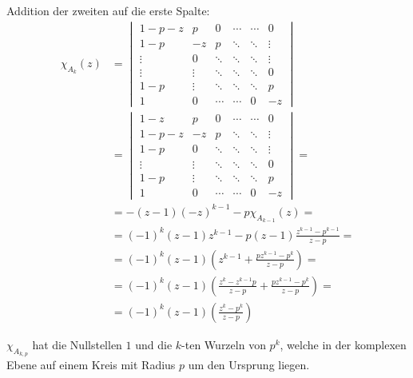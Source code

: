 \begin{flushenum}
\begin{itemize}
      Addition der zweiten auf die erste Spalte:
      \begin{equation*}
      \begin{split} \chi_{A_{k}}(z) & = \begin{vmatrix}
                            1-p-z & p  & 0  & \cdots & \cdots & 0 \\
                            1-p & -z & p  & \ddots & \ddots & \vdots \\
                            \vdots & 0  & \ddots & \ddots & \ddots & \vdots \\
                            \vdots & \vdots  & \ddots & \ddots & \ddots & 0 \\
                            1-p & \vdots  & \ddots & \ddots & \ddots & p \\
                            1 & 0 & \cdots & \cdots & 0 & -z
                           \end{vmatrix} \\
                       & = \begin{vmatrix}
                            1-z & p  & 0  & \cdots & \cdots & 0 \\
                            1-p-z & -z & p  & \ddots & \ddots &\vdots \\
                            1-p & 0  & \ddots & \ddots & \ddots & \vdots \\
                            \vdots & \vdots  & \ddots & \ddots & \ddots & 0 \\
                            1-p & \vdots  & \ddots & \ddots & \ddots & p \\
                            1 & 0 & \cdots & \cdots & 0 & -z
                           \end{vmatrix} = \\
       & = -(z - 1) (-z)^{k-1} - p\chi_{A_{k-1}}(z) = \\
       & = (-1)^{k}(z - 1) z^{k-1} - p(z-1)\frac{z^{k-1}-p^{k-1}}{z-p} = \\
       & = (-1)^{k}(z - 1) \left( z^{k-1} + \frac{pz^{k-1}-p^{k}}{z-p} \right) = \\
       & = (-1)^{k}(z - 1) \left( \frac{z^{k}-z^{k-1}p}{z-p} +
                          \frac{pz^{k-1}-p^{k}}{z-p} \right) = \\
       & = (-1)^{k}(z - 1) \left( \frac{z^{k}-p^{k}}{z-p} \right)
       \end{split}
       \end{equation*}

      $\chi_{A_{k,p}}$ hat die Nullstellen $1$ und die $k$-ten Wurzeln von
      $p^{k}$, welche in der komplexen Ebene auf einem Kreis mit Radius $p$ um
      den Ursprung liegen.
  \end{itemize}


\end{flushenum}
